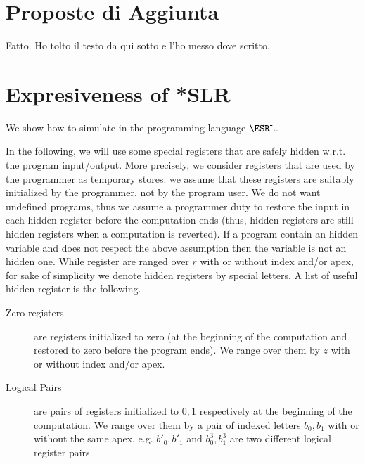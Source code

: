 


\section{Proposte di Aggiunta}

{Fatto. Ho tolto il testo da qui sotto e l'ho messo dove scritto.}


\section{Expresiveness of *SLR}


We show how to simulate  \rprIfName in the programming language $\ESRL$.


In the following, we will use some special registers that are safely hidden w.r.t. the program input/output. More precisely, we consider registers that are used by the programmer as temporary stores: we assume that these registers are suitably initialized by the programmer, not by the program user.
We do not want undefined programs, thus we assume a programmer duty to restore the input in each hidden register before the computation ends (thus, hidden registers are still hidden registers when a computation is reverted). If a program contain an hidden variable and does not respect the above assumption then the variable is not an hidden one. While register are ranged over $r$ with or without index and/or apex, for sake of simplicity we denote hidden registers by special letters. A list of useful hidden register is the following.
\begin{description}
\item[Zero registers] are registers initialized to zero (at the beginning of the computation and restored to zero before the program ends). 
We range over them by $z$ with or without index and/or apex.
\item[Logical Pairs] are pairs of registers initialized to $0,1$ respectively at the beginning of the computation.
We range over them by a pair of indexed letters $b_0,b_1$ with or without the same apex, e.g. $b'_0,b'_1$ and $b^3_0,b^3_1$ are two different logical register pairs.
\end{description}


